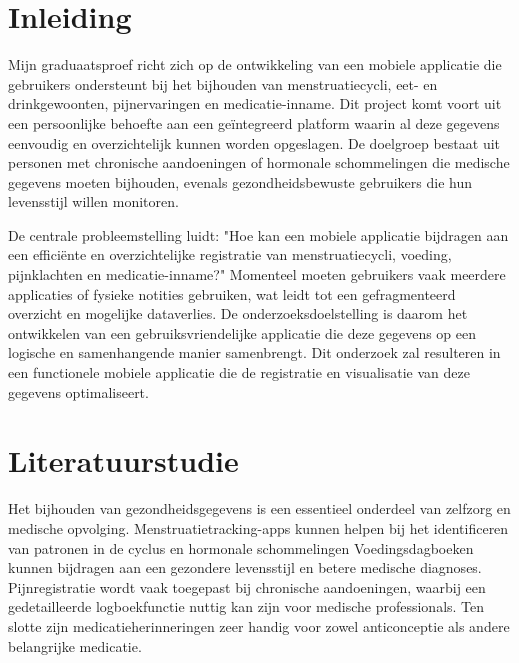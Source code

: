 


% 

\section{Inleiding}%
\label{sec:inleiding}

Mijn graduaatsproef richt zich op de ontwikkeling van een mobiele applicatie die gebruikers ondersteunt bij het bijhouden van menstruatiecycli, eet- en drinkgewoonten, pijnervaringen en medicatie-inname. Dit project komt voort uit een persoonlijke behoefte aan een geïntegreerd platform waarin al deze gegevens eenvoudig en overzichtelijk kunnen worden opgeslagen. De doelgroep bestaat uit personen met chronische aandoeningen of hormonale schommelingen die medische gegevens moeten bijhouden, evenals gezondheidsbewuste gebruikers die hun levensstijl willen monitoren.

De centrale probleemstelling luidt: "Hoe kan een mobiele applicatie bijdragen aan een efficiënte en overzichtelijke registratie van menstruatiecycli, voeding, pijnklachten en medicatie-inname?" Momenteel moeten gebruikers vaak meerdere applicaties of fysieke notities gebruiken, wat leidt tot een gefragmenteerd overzicht en mogelijke dataverlies. De onderzoeksdoelstelling is daarom het ontwikkelen van een gebruiksvriendelijke applicatie die deze gegevens op een logische en samenhangende manier samenbrengt. Dit onderzoek zal resulteren in een functionele mobiele applicatie die de registratie en visualisatie van deze gegevens optimaliseert.


\section{Literatuurstudie}%
\label{sec:literatuurstudie}
Het bijhouden van gezondheidsgegevens is een essentieel onderdeel van zelfzorg en medische opvolging. Menstruatietracking-apps kunnen helpen bij het identificeren van patronen in de cyclus en hormonale schommelingen Voedingsdagboeken kunnen bijdragen aan een gezondere levensstijl en betere medische diagnoses. Pijnregistratie wordt vaak toegepast bij chronische aandoeningen, waarbij een gedetailleerde logboekfunctie nuttig kan zijn voor medische professionals. Ten slotte zijn medicatieherinneringen zeer handig voor zowel anticonceptie als andere belangrijke medicatie. 

